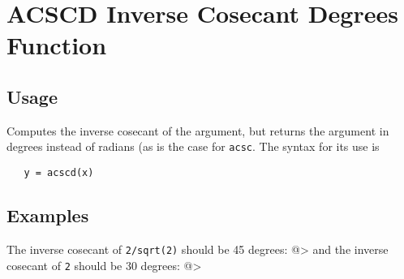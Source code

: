 \section{ACSCD Inverse Cosecant Degrees Function}

\subsection{Usage}

Computes the inverse cosecant of the argument, but returns
the argument in degrees instead of radians (as is the case
for \verb|acsc|. The syntax for its use is
\begin{verbatim}
   y = acscd(x)
\end{verbatim}
\subsection{Examples}

The inverse cosecant of \verb|2/sqrt(2)| should be 45 degrees:
@>
and the inverse cosecant of \verb|2| should be 30 degrees:
@>
